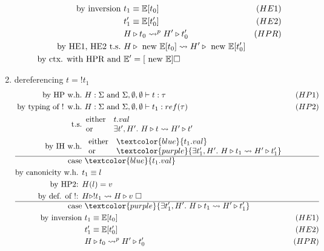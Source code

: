 \documentclass{article}
\begin{document}
\begin{enumerate}
\begin{align*}
            \text{by inversion} &\ t_1 \equiv \mathbb{E}[t_0] & (HE1) \\
                                &\ t_1' \equiv \mathbb{E}[t_0'] & (HE2)\\
                                &\ H\triangleright t_0 \leadsto^p H'\triangleright t_0' & (HPR) \\
            \text{by HE1, HE2 t.s.} &\ H\triangleright\text{ new } \mathbb{E}[t_0] \leadsto H'\triangleright \text{ new } \mathbb{E}[t_0'] \\
            \text{by ctx. with HPR and} &\ \mathbb{E}' = [\text{ new }\mathbb{E}] \square
        \end{align*}
    \item dereferencing $t=!t_1$
        \begin{align*}
            \text{by HP w.h.} &\ H:\Sigma \AND \Sigma,\emptyset,\emptyset\vdash t:\tau & (HP1)\\
            \text{by typing of !  w.h.} &\ H:\Sigma \AND \Sigma,\emptyset,\emptyset\vdash t_1:ref(\tau) & (HP2) \\
            \text{t.s.} & \begin{array}{ll}\text{either} & t.val \\ \text{or} & \exists t',H'.\ H\triangleright t \leadsto H'\triangleright t' \end{array} \\
            \text{by IH w.h.} &\ \begin{array}{ll}\text{either}&\textcolor{blue}{t_1.val}\\\text{or}&\textcolor{purple}{\exists t_1',H'.\ H\triangleright t_1 \leadsto H'\triangleright t_1'}\end{array} \\
            \hline
            \text{case} &\ \textcolor{blue}{t_1.val} \\
            \text{by canonicity w.h. } & t_1 \equiv l \\
            \text{by HP2: } & H(l) = v \\
            \text{by def. of !: } & H\triangleright !t_1 \leadsto H\triangleright v \ \square \\
            \hline
            \text{case} &\ \textcolor{purple}{\exists t_1',H'.\ H\triangleright t_1 \leadsto H'\triangleright t_1'} \\
            \text{by inversion} &\ t_1 \equiv \mE[t_0] & (HE1) \\
                                &\ t_1'\equiv \mE[t_0']& (HE2) \\
                                &\ H\triangleright t_0\leadsto^p H'\triangleright t_0'  & (HPR) \\

\end{align*}
\end{enumerate}
\end{document}
